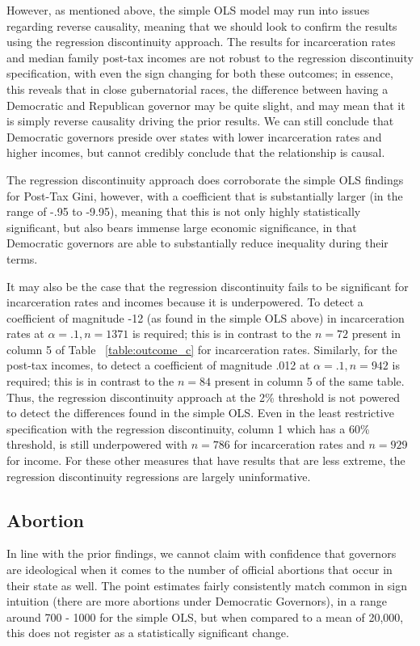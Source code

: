 \documentclass{article}
\begin{document}
However, as mentioned above, the simple OLS model may run into issues regarding reverse causality, meaning that we should look to confirm the results using the regression discontinuity approach. The results for incarceration rates and median family post-tax incomes are not robust to the regression discontinuity specification, with even the sign changing for both these outcomes; in essence, this reveals that in close gubernatorial races, the difference between having a Democratic and Republican governor may be quite slight, and may mean that it is simply reverse causality driving the prior results. We can still conclude that Democratic governors preside over states with lower incarceration rates and higher incomes, but cannot credibly conclude that the relationship is causal.

The regression discontinuity approach does corroborate the simple OLS findings for Post-Tax Gini, however, with a coefficient that is substantially larger (in the range of -.95 to -9.95), meaning that this is not only highly statistically significant, but also bears immense large economic significance, in that Democratic governors are able to substantially reduce inequality during their terms.

It may also be the case that the regression discontinuity fails to be significant for incarceration rates and incomes because it is underpowered. To detect a coefficient of magnitude -12 (as found in the simple OLS above) in incarceration rates at $\alpha = .1, n = 1371$ is required; this is in contrast to the $n = 72$  present in column 5 of Table ~\ref{table:outcome_c} for incarceration rates. Similarly, for the post-tax incomes, to detect a coefficient of magnitude .012 at $\alpha =.1, n = 942$ is required; this is in contrast to the $n = 84$ present in column 5 of the same table. Thus, the regression discontinuity approach at the 2\% threshold is not powered to detect the differences found in the simple OLS. Even in the least restrictive specification with the regression discontinuity, column 1 which has a 60\% threshold, is still underpowered with $n = 786$ for incarceration rates and $n = 929$ for income. For these other measures that have results that are less extreme, the regression discontinuity regressions are largely uninformative. 


\subsection{Abortion}

In line with the prior findings, we cannot claim with confidence that governors are ideological when it comes to the number of official abortions that occur in their state as well. The point estimates fairly consistently match common in sign intuition (there are more abortions under Democratic Governors), in a range around 700 - 1000 for the simple OLS, but when compared to a mean of 20,000, this does not register as a statistically significant change.
\end{document}
